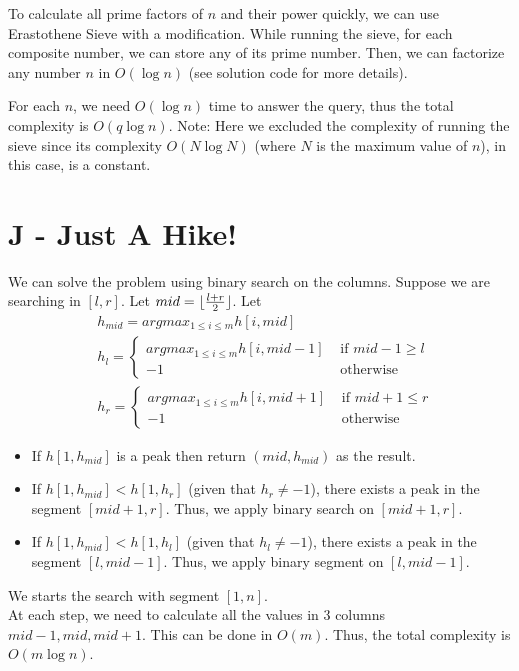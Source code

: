 \documentclass{article}
\DeclarePairedDelimiter\floor{\lfloor}{\rfloor}
\begin{document}
\noindent To calculate all prime factors of $n$ and their power quickly, we can use Erastothene Sieve with a modification. While
running the sieve, for each composite number, we can store any of its prime number. Then, we can factorize any number $n$ in
$O(\log{n})$ (see solution code for more details).

For each $n$, we need $O(\log{n})$ time to answer the query, thus the total complexity is $O(q\log{n})$. Note: Here we excluded
the complexity of running the sieve since its complexity $O(N\log{N})$ (where $N$ is the maximum value of $n$), in this case, is
a constant.

\section*{J - Just A Hike!}
We can solve the problem using binary search on the columns. Suppose we are searching in $[l, r]$. 
Let $mid = \floor{\frac{l + r}{2}}$. Let 
\begin{equation}
\begin{split}
&h_{mid} = argmax_{1 \leq i \leq m} h[i, mid]\\
&h_l = 
\begin{cases}
argmax_{1 \leq i \leq m} h[i, mid - 1] & \text{ if $mid - 1 \geq l$}\\
-1 & \text{ otherwise}
\end{cases}\\
&h_r = 
\begin{cases}
argmax_{1 \leq i \leq m} h[i, mid + 1] & \text{ if $mid + 1 \leq r$}\\
-1 & \text{ otherwise}
\end{cases}
\end{split}
\end{equation}
\begin{itemize}
\item
If $h[1, h_{mid}]$ is a peak then return $(mid, h_{mid})$ as the result.
\item
If $h[1, h_{mid}] < h[1, h_r]$ (given that $h_r \neq -1$), there exists a peak in the segment $[mid + 1, r]$. Thus,
we apply binary search on $[mid + 1, r]$.
\item
If $h[1, h_{mid}] < h[1, h_l]$ (given that $h_l \neq -1$), there exists a peak in the segment $[l, mid - 1]$. Thus, we apply binary segment on $[l, mid - 1]$.
\end{itemize}
We starts the search with segment $[1, n]$.\\

\noindent At each step, we need to calculate all the values in $3$ columns $mid - 1, mid, mid + 1$. This can be done in $O(m)$. Thus, the total complexity is $O(m\log{n})$.
\end{document}
